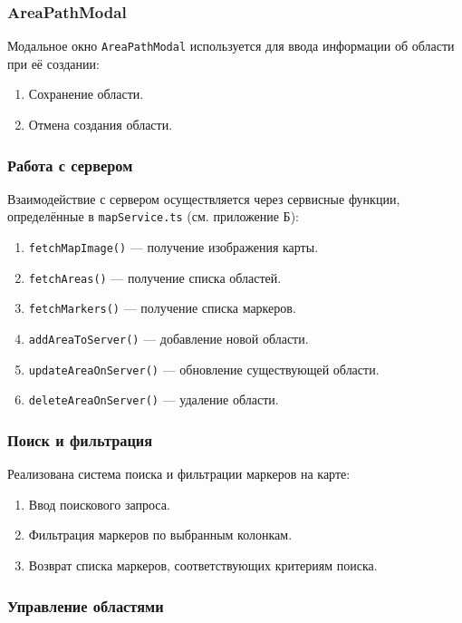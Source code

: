 \subsubsection{AreaPathModal}
Модальное окно \texttt{AreaPathModal} используется для ввода информации об области при её создании:
\begin{enumerate}
    \item Сохранение области.
    \item Отмена создания области.
\end{enumerate}

\subsubsection{Работа с сервером}

Взаимодействие с сервером осуществляется через сервисные функции, определённые в \texttt{mapService.ts} (см. приложение Б):
\begin{enumerate}
    \item \texttt{fetchMapImage()} --- получение изображения карты.
    \item \texttt{fetchAreas()} --- получение списка областей.
    \item \texttt{fetchMarkers()} --- получение списка маркеров.
    \item \texttt{addAreaToServer()} --- добавление новой области.
    \item \texttt{updateAreaOnServer()} --- обновление существующей области.
    \item \texttt{deleteAreaOnServer()} --- удаление области.
\end{enumerate}

\subsubsection{Поиск и фильтрация}

Реализована система поиска и фильтрации маркеров на карте:
\begin{enumerate}
    \item Ввод поискового запроса.
    \item Фильтрация маркеров по выбранным колонкам.
    \item Возврат списка маркеров, соответствующих критериям поиска.
\end{enumerate}

\subsubsection{Управление областями}

